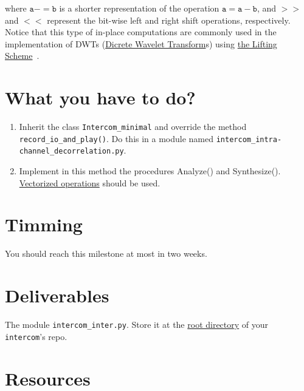 where $\mathtt{a -= b}$ is a shorter representation of the operation
$\mathtt{a = a - b}$, and $\mathtt{>>}$ and $\mathtt{<<}$ represent
the bit-wise left and right shift operations, respectively. Notice
that this type of in-place computations are commonly used in the
implementation of DWTs
(\href{https://en.wikipedia.org/wiki/Discrete_wavelet_transform}{Dicrete
  Wavelet Transform}s) using
\href{https://cm-bell-labs.github.io/who/wim/papers/athome/athome.pdf}{the
  Lifting Scheme}~\cite{2006.sweldens}.

\section{What you have to do?}

\begin{enumerate}
\item Inherit the class \texttt{Intercom\_minimal} and override the
  method \texttt{record\_io\_and\_play()}. Do this in a module named
  \texttt{intercom\_intra-channel\_decorrelation.py}.
\item Implement in this method the procedures Analyze() and
  Synthesize(). \href{https://www.oreilly.com/library/view/python-for-data/9781449323592/ch04.html}{Vectorized
    operations} should be used.
\end{enumerate}

\section{Timming}

You should reach this milestone at most in two weeks.

\section{Deliverables}

The module \texttt{intercom\_inter.py}. Store
it at the
\href{https://github.com/Tecnologias-multimedia/intercom}{root
  directory} of your \texttt{intercom}'s repo.

\section{Resources}


